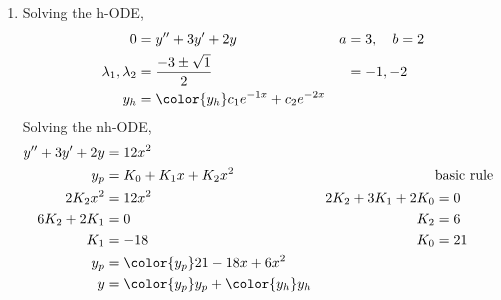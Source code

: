 \begin{enumerate}
    \item Solving the h-ODE,
          \begin{align}
              0                        & = y'' + 3y' + 2y                          &
              a                        & = 3, \quad b = 2                            \\
              \lambda_{1}, \lambda_{2} & = \frac{-3 \pm \sqrt{1}}{2}               &
                                       & = -1, -2                                    \\
              y_{h}                    & = \color{y_h} c_{1}e^{-1x} + c_{2}e^{-2x}
          \end{align}
          Solving the nh-ODE,
          \begin{align}
              y'' + 3y' + 2y           & = 12x^{2}                                     \\
              y_{p}                    & = K_{0} + K_{1}x + K_{2}x^{2}               &
                                       & \text{basic rule}                             \\
              2K_{2}x^{2}              & = 12x^{2}                                   &
              2K_{2} + 3K_{1} + 2K_{0} & = 0                                           \\
              6K_{2} + 2K_{1}          & = 0                                         &
              K_{2}                    & = 6                                           \\
              K_{1}                    & = -18                                       &
              K_{0}                    & = 21                                          \\
              y_{p}                    & = \color{y_p} 21 - 18x + 6x^{2}               \\
              y                        & = {\color{y_p} y_{p}} + {\color{y_h} y_{h}}
          \end{align}


\end{enumerate}

